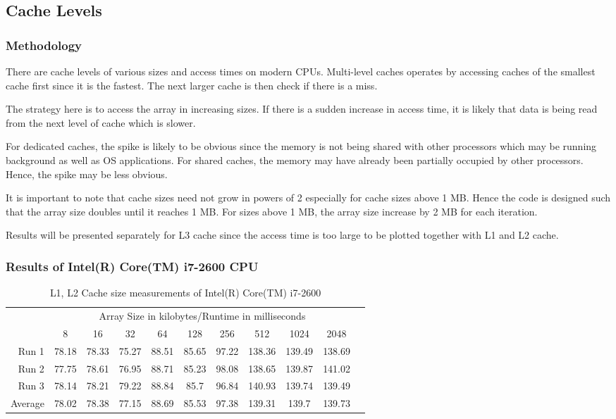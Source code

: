 \documentclass{article}
\begin{document}
\pagebreak

\subsection{Cache Levels}

\subsubsection{Methodology}

There are cache levels of various sizes and access times on modern CPUs. Multi-level caches operates by accessing caches of the smallest cache first since it is the fastest. The next larger cache is then check if there is a miss. 

The strategy here is to access the array in increasing sizes. If there is a sudden increase in access time, it is likely that data is being read from the next level of cache which is slower.

For dedicated caches, the spike is likely to be obvious since the memory is not being shared with other processors which may be running background as well as OS applications.  
For shared caches, the memory may have already been partially occupied by other processors. Hence, the spike may be less obvious.

It is important to note that cache sizes need not grow in powers of 2 especially for cache sizes above 1 MB. Hence the code is designed such that the array size doubles until it reaches 1 MB. For sizes above 1 MB, the array size increase by 2 MB  for each iteration.

Results will be presented separately for L3 cache since the access time is too large to be plotted together with L1 and L2 cache.

\subsubsection{Results of Intel(R) Core(TM) i7-2600 CPU}


\begin{table}[H]

\begin{tabular}{r|c|c|c|c|c|c|c|c|c|c|}

\multicolumn{1}{r}{}
 &  \multicolumn{9}{c}{Array Size in kilobytes/Runtime in milliseconds} \\
\cline{2-10}
   & 8 & 16 & 32 & 64 & 128 & 256 & 512 & 1024 & 2048\\
\cline{2-10}
Run 1 & 78.18 &	78.33 &	75.27 &	88.51 &	85.65 &	97.22 &	138.36 & 139.49 & 138.69 \\
\cline{2-10}
Run 2 & 77.75 &	78.61 &	76.95 &	88.71 &	85.23 &	98.08 &	138.65 & 139.87 & 141.02 \\
\cline{2-10}
Run 3 & 78.14 &	78.21 &	79.22  & 88.84 & 85.7 &	96.84 &	140.93 & 139.74 & 139.49 \\
\cline{2-10}
Average & 78.02 &	78.38 & 77.15 &	88.69 &	85.53 &	97.38 &	139.31 &	139.7 &	139.73 \\
\cline{2-10}
\end{tabular}
 \caption{L1, L2 Cache size measurements of Intel(R) Core(TM) i7-2600}
 \label{tab:i7L1}
\end{table}
\end{document}
